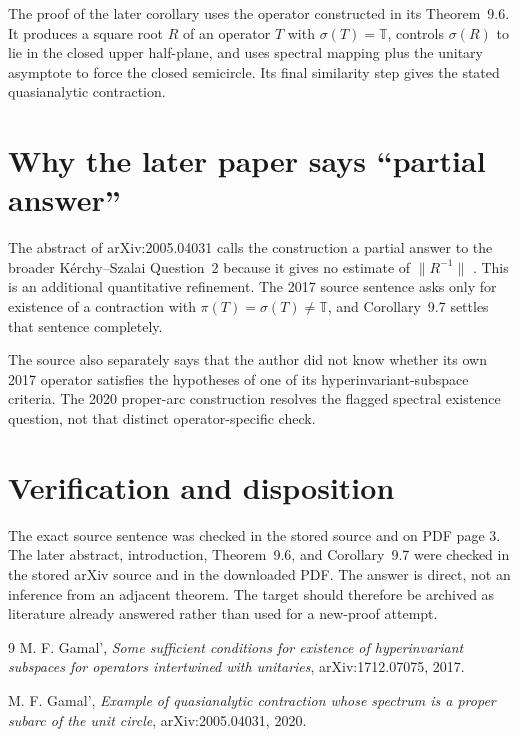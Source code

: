 \documentclass[11pt]{article}
\newcommand{\T}{\mathbb T}
\newcommand{\spectrum}{\sigma}
\begin{document}
The proof of the later corollary uses the operator constructed in its
Theorem~9.6.  It produces a square root $R$ of an operator $T$ with
$\spectrum(T)=\T$, controls $\spectrum(R)$ to lie in the closed upper
half-plane, and uses spectral mapping plus the unitary asymptote to force the
closed semicircle.  Its final similarity step gives the stated quasianalytic
contraction.

\section{\hspace{0.35em}Why the later paper says ``partial answer''}

The abstract of arXiv:2005.04031 calls the construction a partial answer to
the broader K\'erchy--Szalai Question~2 because it gives no estimate of
$\lVert R^{-1}\rVert$ \cite{answer}.  This is an additional quantitative
refinement.  The 2017 source sentence asks only for existence of a
contraction with $\pi(T)=\spectrum(T)\ne\T$, and Corollary~9.7 settles that
sentence completely.

The source also separately says that the author did not know whether its own
2017 operator satisfies the hypotheses of one of its hyperinvariant-subspace
criteria.  The 2020 proper-arc construction resolves the flagged spectral
existence question, not that distinct operator-specific check.

\section{\hspace{0.35em}Verification and disposition}

The exact source sentence was checked in the stored source and on PDF page 3.
The later abstract, introduction, Theorem~9.6, and Corollary~9.7 were checked
in the stored arXiv source and in the downloaded PDF.  The answer is direct,
not an inference from an adjacent theorem.  The target should therefore be
archived as literature already answered rather than used for a new-proof
attempt.

\begin{thebibliography}{9}
M. F. Gamal',
\emph{Some sufficient conditions for existence of hyperinvariant subspaces
for operators intertwined with unitaries},
arXiv:1712.07075, 2017.

M. F. Gamal',
\emph{Example of quasianalytic contraction whose spectrum is a proper subarc
of the unit circle},
arXiv:2005.04031, 2020.
\end{thebibliography}
\end{document}
